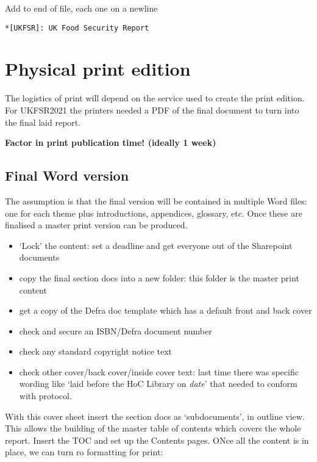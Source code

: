 \documentclass[
]{book}
\providecommand{\tightlist}{%
  \setlength{\itemsep}{0pt}\setlength{\parskip}{0pt}}
\begin{document}
Add to end of file, each one on a newline

\begin{verbatim}
*[UKFSR]: UK Food Security Report
\end{verbatim}

\hypertarget{physical-print-edition}{%
\chapter{Physical print edition}\label{physical-print-edition}}

The logistics of print will depend on the service used to create the print edition. For UKFSR2021 the printers needed a PDF of the final document to turn into the final laid report.

\textbf{Factor in print publication time! (ideally 1 week)}

\hypertarget{final-word-version}{%
\section{Final Word version}\label{final-word-version}}

The assumption is that the final version will be contained in multiple Word files: one for each theme plus introductions, appendices, glossary, etc. Once these are finalised a master print version can be produced.

\begin{itemize}
\tightlist
\item
  `Lock' the content: set a deadline and get everyone out of the Sharepoint documents
\item
  copy the final section docs into a new folder: this folder is the master print content
\item
  get a copy of the Defra doc template which has a default front and back cover
\item
  check and secure an ISBN/Defra document number
\item
  check any standard copyright notice text
\item
  check other cover/back cover/inside cover text: last time there was specific wording like `laid before the HoC Library on \emph{date}' that needed to conform with protocol.
\end{itemize}

With this cover sheet insert the section docs as `subdocuments', in outline view. This allows the building of the master table of contents which covers the whole report. Insert the TOC and set up the Contents pages. ONce all the content is in place, we can turn ro formatting for print:
\end{document}
